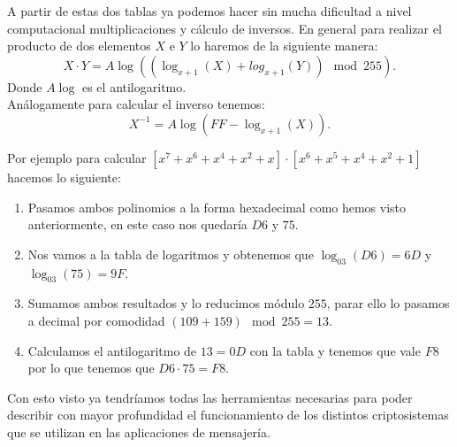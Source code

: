 \newpage
A partir de estas dos tablas ya podemos hacer sin mucha dificultad a nivel computacional multiplicaciones y cálculo de inversos. En general para realizar el producto de dos elementos $X$ e $Y$ lo haremos de la siguiente manera:
$$
	X\cdot Y = A\log((\log_{x+1}(X)+log_{x+1}(Y)) \mod 255).
$$
Donde $A\log$ es el antilogaritmo.\\
Análogamente para calcular el inverso tenemos:
$$
	X^{-1} = A\log(FF-\log_{x+1}(X)).
$$

Por ejemplo para calcular $[x^7+x^6+x^4+x^2+x]\cdot[x^6+x^5+x^4+x^2+1]$ hacemos lo siguiente:
\begin{enumerate}
	\item Pasamos ambos polinomios a la forma hexadecimal como hemos visto anteriormente, en este caso nos quedaría $D6$ y $75$.
	\item Nos vamos a la tabla de logaritmos y obtenemos que $\log_{03}(D6)=6D$ y $\log_{03}(75)=9F$.
	\item Sumamos ambos resultados y lo reducimos módulo $255$, parar ello lo pasamos a decimal por comodidad $(109+159)\mod255=13$.
	\item Calculamos el antilogaritmo de $13=0D$ con la tabla y tenemos que vale $F8$ por lo que tenemos que $D6\cdot 75 = F8$.
\end{enumerate}

Con esto visto ya tendríamos todas las herramientas necesarias para poder describir con mayor profundidad el funcionamiento de los distintos criptosistemas que se utilizan en las aplicaciones de mensajería.


